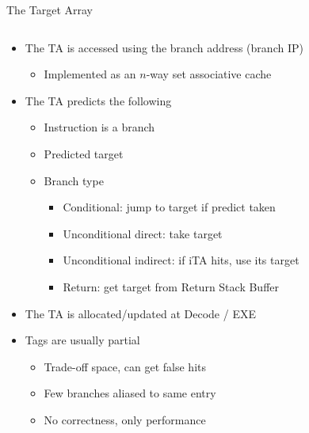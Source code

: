 \documentclass[aspectratio=169]{beamer}
\begin{document}
\begin{frame}{The Target Array}
\begin{columns}[T,onlytextwidth]
  \begin{column}{0.63\textwidth}
    \begin{itemize}
      \item The TA is accessed using the branch address (branch IP)
      \begin{itemize}
        \item Implemented as an $n$-way set associative cache
      \end{itemize}

      \item The TA predicts the following
      \begin{itemize}
        \item Instruction is a branch
        \item Predicted target
        \item Branch type
        \begin{itemize}
          \item Conditional: jump to target if predict taken
          \item Unconditional direct: take target
          \item Unconditional indirect: if iTA hits, use its target
          \item Return: get target from Return Stack Buffer
        \end{itemize}
      \end{itemize}

      \item The TA is allocated/updated at Decode / EXE

      \item Tags are usually partial
      \begin{itemize}
        \item Trade-off space, can get false hits
        \item Few branches aliased to same entry
        \item No correctness, only performance
      \end{itemize}
    \end{itemize}
  \end{column}

  \begin{column}{0.37\textwidth}
    \centering
\end{column}
\end{columns}
\end{frame}
\end{document}
